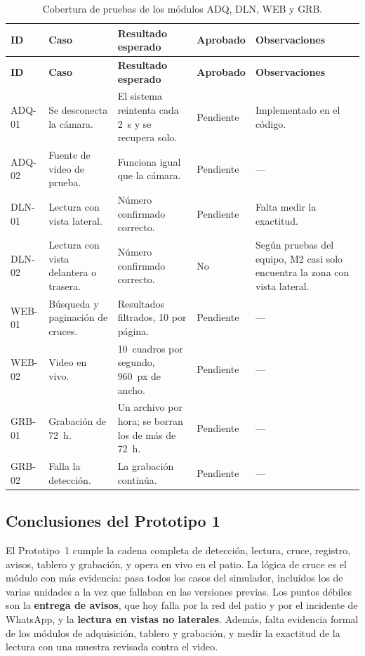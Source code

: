 {\small
\begin{longtable}{@{}L{1.3cm}L{4.3cm}L{3.8cm}C{1.4cm}L{3.2cm}@{}}
  \caption{Cobertura de pruebas de los módulos ADQ, DLN, WEB y GRB.}
  \label{tab:adq-dln-web-grb} \\
  \toprule
  \textbf{ID} & \textbf{Caso} & \textbf{Resultado esperado} &
    \textbf{Aprobado} & \textbf{Observaciones} \\
  \midrule
  \endfirsthead
  \toprule
  \textbf{ID} & \textbf{Caso} & \textbf{Resultado esperado} &
    \textbf{Aprobado} & \textbf{Observaciones} \\
  \midrule
  \endhead
  ADQ-01 & Se desconecta la cámara. & El sistema reintenta cada 2~s y se
    recupera solo. & Pendiente & Implementado en el código. \\
  ADQ-02 & Fuente de video de prueba. & Funciona igual que la cámara. &
    Pendiente & --- \\
  DLN-01 & Lectura con vista lateral. & Número confirmado correcto. &
    Pendiente & Falta medir la exactitud. \\
  DLN-02 & Lectura con vista delantera o trasera. & Número confirmado
    correcto. & No & Según pruebas del equipo, M2 casi solo encuentra la
    zona con vista lateral. \\
  WEB-01 & Búsqueda y paginación de cruces. & Resultados filtrados, 10 por
    página. & Pendiente & --- \\
  WEB-02 & Video en vivo. & 10~cuadros por segundo, 960~px de ancho. &
    Pendiente & --- \\
  GRB-01 & Grabación de 72~h. & Un archivo por hora; se borran los de más
    de 72~h. & Pendiente & --- \\
  GRB-02 & Falla la detección. & La grabación continúa. & Pendiente &
    --- \\
  \bottomrule
\end{longtable}
}

\subsection{Conclusiones del Prototipo 1}

El Prototipo~1 cumple la cadena completa de detección, lectura, cruce,
registro, avisos, tablero y grabación, y opera en vivo en el patio. La
lógica de cruce es el módulo con más evidencia: pasa todos los casos del
simulador, incluidos los de varias unidades a la vez que fallaban en las
versiones previas. Los puntos débiles son la \textbf{entrega de avisos},
que hoy falla por la red del patio y por el incidente de WhatsApp, y la
\textbf{lectura en vistas no laterales}. Además, falta evidencia formal de
los módulos de adquisición, tablero y grabación, y medir la exactitud de la
lectura con una muestra revisada contra el video.
